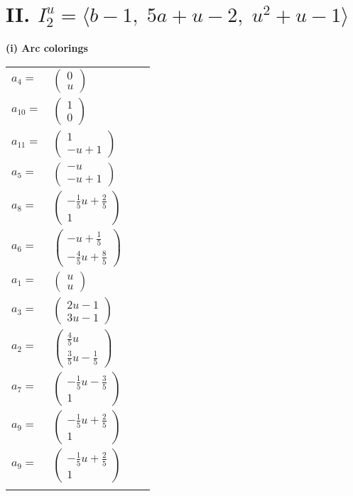 \documentclass[1p]{elsarticle_modified}
\theoremstyle{definition}
\begin{document}
\centering \section*{II. $I^u_{2}= \langle b-1,\;5 a+u-2,\;u^2+u-1 \rangle$}
\flushleft \textbf{(i) Arc colorings}\\
\begin{tabular}{m{7pt} m{180pt} m{7pt} m{180pt} }
\flushright $a_{4}=$&$\begin{pmatrix}0\\u\end{pmatrix}$ \\
\flushright $a_{10}=$&$\begin{pmatrix}1\\0\end{pmatrix}$ \\
\flushright $a_{11}=$&$\begin{pmatrix}1\\- u+1\end{pmatrix}$ \\
\flushright $a_{5}=$&$\begin{pmatrix}- u\\- u+1\end{pmatrix}$ \\
\flushright $a_{8}=$&$\begin{pmatrix}-\frac{1}{5} u+\frac{2}{5}\\1\end{pmatrix}$ \\
\flushright $a_{6}=$&$\begin{pmatrix}- u+\frac{1}{5}\\-\frac{4}{5} u+\frac{8}{5}\end{pmatrix}$ \\
\flushright $a_{1}=$&$\begin{pmatrix}u\\u\end{pmatrix}$ \\
\flushright $a_{3}=$&$\begin{pmatrix}2 u-1\\3 u-1\end{pmatrix}$ \\
\flushright $a_{2}=$&$\begin{pmatrix}\frac{4}{5} u\\\frac{3}{5} u-\frac{1}{5}\end{pmatrix}$ \\
\flushright $a_{7}=$&$\begin{pmatrix}-\frac{1}{5} u-\frac{3}{5}\\1\end{pmatrix}$ \\
\flushright $a_{9}=$&$\begin{pmatrix}-\frac{1}{5} u+\frac{2}{5}\\1\end{pmatrix}$\\ \flushright $a_{9}=$&$\begin{pmatrix}-\frac{1}{5} u+\frac{2}{5}\\1\end{pmatrix}$\\&\end{tabular}
\end{document}
